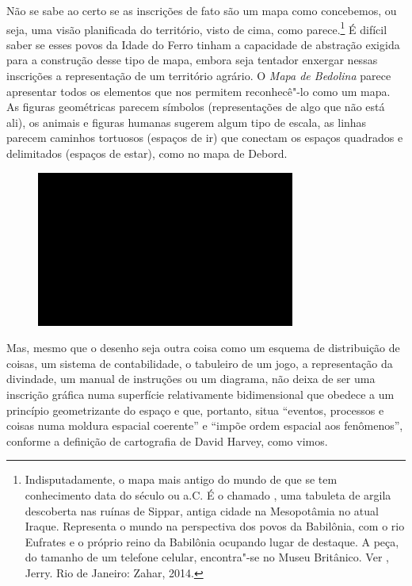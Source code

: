 Não se sabe ao certo se as inscrições de fato são um mapa como
concebemos, ou seja, uma visão planificada do território, visto de cima,
como parece.\footnote{Indisputadamente, o mapa mais antigo do mundo de
  que se tem conhecimento data do século  ou  a.C. É o chamado
  {}, uma tabuleta de argila descoberta nas ruínas de
  Sippar, antiga cidade na Mesopotâmia no atual Iraque. Representa o
  mundo na perspectiva dos povos da Babilônia, com o rio Eufrates e o
  próprio reino da Babilônia ocupando lugar de destaque. A peça, do
  tamanho de um telefone celular, encontra"-se no Museu Britânico. Ver
  , Jerry. {} Rio de
  Janeiro: Zahar, 2014.} É difícil saber se esses povos da Idade do
Ferro tinham a capacidade de abstração exigida para a construção desse
tipo de mapa, embora seja tentador enxergar nessas inscrições a
representação de um território agrário. O \emph{Mapa de Bedolina} parece
apresentar todos os elementos que nos permitem reconhecê"-lo como um
mapa. As figuras geométricas parecem símbolos (representações de algo
que não está ali), os animais e figuras humanas sugerem algum tipo de
escala, as linhas parecem caminhos tortuosos (espaços de ir) que
conectam os espaços quadrados e delimitados (espaços de estar), como no
mapa de Debord.

\begin{figure}[!ht]

\centering
 \includegraphics[width=85mm]{./imgs/im1.jpg}
\caption{\tiny{}}

\end{figure}

Mas, mesmo que o desenho seja outra coisa como um esquema de
distribuição de coisas, um sistema de contabilidade, o tabuleiro de um
jogo, a representação da divindade, um manual de instruções ou um
diagrama, não deixa de ser uma inscrição gráfica numa superfície
relativamente bidimensional que obedece a um princípio geometrizante do
espaço e que, portanto, situa ``eventos, processos e coisas numa moldura
espacial coerente'' e ``impõe ordem espacial aos fenômenos'', conforme a
definição de cartografia de David Harvey, como vimos.

